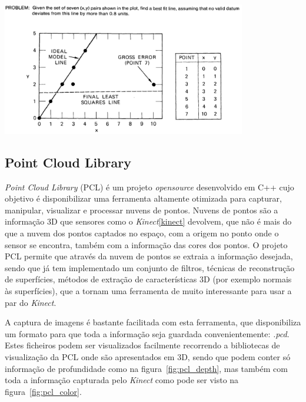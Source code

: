 \begin{center}
	\includegraphics[width=0.80\textwidth]{figures/least_squares_shortcomings.png}
	\label{fig:ransac}
\end{center}


\subsection[PCL]{Point Cloud Library}

\emph{Point Cloud Library} (PCL) é um projeto \emph{opensource} desenvolvido em C++ cujo objetivo é disponibilizar uma ferramenta altamente otimizada para capturar, manipular, visualizar e processar nuvens de pontos. Nuvens de pontos são a informação 3D que sensores como o \emph{Kinect}\ref{kinect} devolvem, que não é mais do que a nuvem dos pontos captados no espaço, com a origem no ponto onde o sensor se encontra, também com a informação das cores dos pontos.
O projeto PCL \cite{Rusu_ICRA2011_PCL} permite que através da nuvem de pontos se extraia a informação desejada, sendo que já tem implementado um conjunto de filtros, técnicas de reconstrução de superfícies, métodos de extração de características 3D (por exemplo normais às superfícies), que a tornam uma ferramenta de muito interessante para usar a par do \emph{Kinect}.

A captura de imagens é bastante facilitada com esta ferramenta, que disponibiliza um formato para que toda a informação seja guardada convenientemente: \emph{.pcd}. Estes ficheiros podem ser visualizados facilmente recorrendo a bibliotecas de visualização da PCL onde são apresentados em 3D, sendo que podem conter só informação de profundidade como na figura~\ref{fig:pcl_depth}, mas também com toda a informação capturada pelo \emph{Kinect} como pode ser visto na figura~\ref{fig:pcl_color}.

